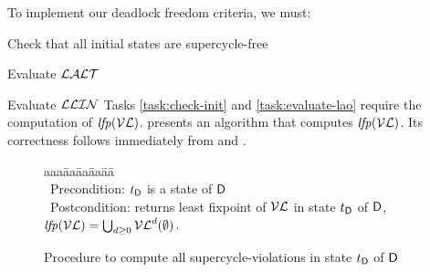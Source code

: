 To implement our deadlock freedom criteria, we must:
\bn
\item \label{task:check-init} Check that all initial states are supercycle-free
\item \label{task:evaluate-lao} Evaluate $\mathcal{LALT}$
\item \label{task:evaluate-llin} Evaluate $\mathcal{LLIN}$
\en
%
Tasks \ref{task:check-init} and \ref{task:evaluate-lao} require the computation of $\mathit{lfp}(\mathcal{VL})$.
 presents an algorithm that computes
$\mathit{lfp}(\mathcal{VL})$. Its correctness follows immediately from  and .


   \label{secn:computeLFP}
%   

\newcommand{\fpt}{\mathit{fixpoint}}
\newcommand{\VLA}[5]{\ensuremath{\MATHIDN{V_{\dsk{#1}{#2},#3} [#4 #5]}}}    %

\begin{figure}[H]
\setcounter{lctr}{0}
\begin{tabbing}\label{alg:compute-lfp}
aaa\= aa\= aa\= aa\= aa\=\kill
\cLFP{$\dsk{\act}{\l},\tD$}\\
\cmnt\ Precondition: $t_\mathsf{D}$ is a state of $\mathsf{D}$\\
\cmnt\ Postcondition: returns least fixpoint of $\mathcal{VL}$ in state $t_\mathsf{D}$ of $\mathsf{D}$, \ie $\mathit{lfp}(\mathcal{VL}) = \bigcup_{d \ge 0} \mathcal{VL}^{d} (\emptyset)$.\\

\lio{\XS \gts \ewfg;}

\lio{\REPEAT}
   \lit{\XS \gts \YS}
\lio{\UNTIL\ \XS = \YS;}

\lion{\RETURNE{\XS}}
\end{tabbing}
\caption{Procedure to compute all supercycle-violations in state $t_\mathsf{D}$ of $\mathsf{D}$}
\label{fig:algcomputeLFP}
\end{figure}




